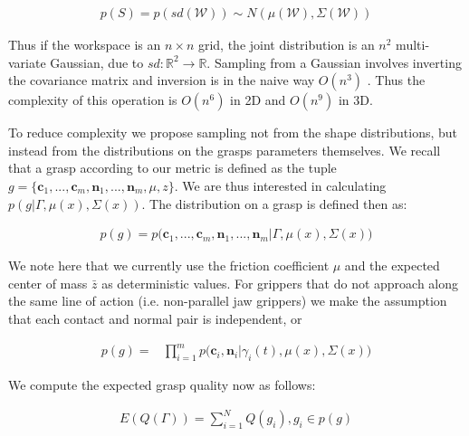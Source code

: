 \documentclass[letterpaper, 10 pt, conference]{ieeeconf}  %
\begin{document}
\begin{align}\label{eq:joint_shape}
p(S) = p(sd(\mathcal{W})) \sim N(\mu(\mathcal{W}),\Sigma(\mathcal{W}))
\end{align}

Thus if the workspace is an $n \times n$ grid, the joint distribution is an  $n^2$ multi-variate Gaussian, due to $sd:\mathbb{R}^2 \rightarrow \mathbb{R}$.  Sampling from a Gaussian involves inverting the covariance matrix and inversion is in the naive way $O(n^3)$ \cite{petersen2008matrix}. %
Thus the complexity of this operation is $O(n^6)$ in 2D and $O(n^9)$ in 3D. 

To reduce complexity we propose sampling not from the shape distributions, but instead from the distributions on the grasps parameters themselves. We recall that a grasp according to our metric is defined as the tuple $g = \lbrace \textbf{c}_1,...,\textbf{c}_m,\textbf{n}_1,...,\textbf{n}_m,\mu, z \rbrace$. We are thus interested in calculating $p(g|\Gamma,\mu(x),\Sigma(x))$. The distribution on a grasp is defined then as: 

\begin{align}\label{eq:joint_on_shape}
p(g) = p\big(\textbf{c}_1,...,\textbf{c}_m,\textbf{n}_1,...,\textbf{n}_m|\Gamma,\mu(x),\Sigma(x)\big)
\end{align}

We note here that we currently use the friction coefficient $\mu$ and the expected center of mass $\bar{z}$ as deterministic values. For grippers that do not approach along the same line of action (i.e. non-parallel jaw grippers) we make the assumption that each contact and normal pair is independent, or 

\vspace{-2ex}
\begin{align}\label{eq:independence}
p(g) = &\prod_{i=1}^mp\big(\textbf{c}_i,\textbf{n}_i|\gamma_i(t),\mu(x),\Sigma(x)\big)
\end{align}



We compute the expected grasp quality now as follows: 

\vspace{-2ex}
\begin{align}\label{eq:grasp_sampling}
E(Q(\Gamma)) = \sum_{i=1}^N Q(g_i) , g_i \in p(g)
\end{align}
\end{document}
